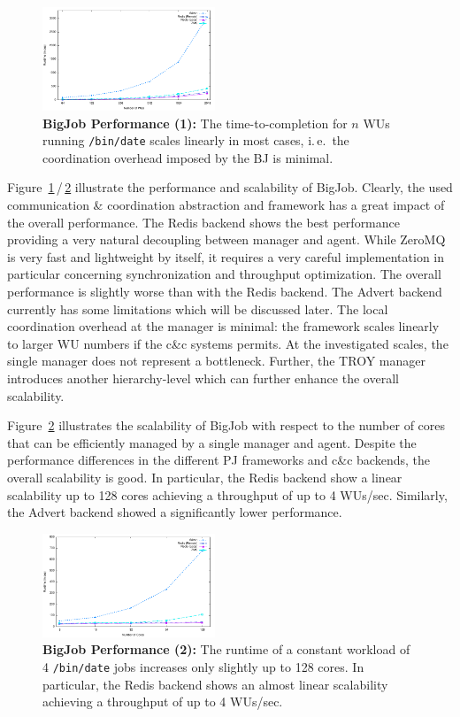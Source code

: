 \documentclass[conference,final]{IEEEtran}
\begin{document}
\begin{figure}[htbp] \centering
\includegraphics[width=0.46\textwidth]{perf/bigjob-varying-wus-alamo.pdf}
\caption{\textbf{BigJob Performance (1):} The 
time-to-completion for $n$ WUs running \texttt{/bin/date} scales linearly
in most cases, i.\,e.\ the coordination overhead imposed by the BJ is 
minimal. }
\label{fig:perf_bigjob-varying-wus} \end{figure}

Figure~\ref{fig:perf_bigjob-varying-wus}\,/\,\ref{fig:perf_bigjob-varying-cores}
illustrate the performance and scalability of BigJob. Clearly, the used
communication \& coordination abstraction and framework has a great impact of
the overall performance. The Redis backend shows the best performance providing
a very natural decoupling between manager and agent. While ZeroMQ is very fast
and lightweight by itself, it requires a very careful implementation in
particular concerning synchronization and throughput optimization. The overall
performance is slightly worse than with the Redis backend. The Advert backend
currently has some limitations which will be discussed later. The local
coordination overhead at the manager is minimal: the framework scales linearly
to larger WU numbers if the c\&c systems permits. At the investigated scales,
the single manager does not represent a bottleneck. Further, the TROY manager
introduces another hierarchy-level which can further enhance the overall
scalability.

Figure~\ref{fig:perf_bigjob-varying-cores} illustrates the scalability of BigJob
with respect to the number of cores that can be efficiently managed by a single
manager and agent. Despite the performance differences in the different PJ
frameworks and c\&c backends, the overall scalability is good. In particular, 
the Redis backend show a linear scalability up to 128 cores achieving a 
throughput of up to 4 WUs/sec. Similarly, the Advert backend showed a significantly lower performance.

\begin{figure}[htbp] \centering
\includegraphics[width=0.46\textwidth]{perf/bigjob-varying-cores-alamo.pdf}
\caption{\textbf{BigJob Performance (2):}  The
runtime of a constant workload of 4 \texttt{/bin/date} jobs 
increases only slightly up to 128 cores. In particular, the Redis backend shows
an almost linear scalability achieving a throughput of up to 4 WUs/sec. }
\label{fig:perf_bigjob-varying-cores} \end{figure}
\end{document}
